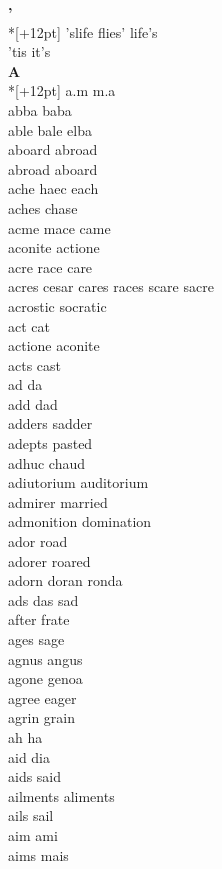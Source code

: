 
\vspace{14pt}
\noindent\textbf{\Large '}\\*[+12pt]
'slife flies' life's\\
'tis it's\\

\vspace{14pt}
\noindent\textbf{\Large A}\\*[+12pt]
a.m m.a\\
abba baba\\
able bale elba\\
aboard abroad\\
abroad aboard\\
ache haec each\\
aches chase\\
acme mace came\\
aconite actione\\
acre race care\\
acres cesar cares races scare sacre\\
acrostic socratic\\
act cat\\
actione aconite\\
acts cast\\
ad da\\
add dad\\
adders sadder\\
adepts pasted\\
adhuc chaud\\
adiutorium auditorium\\
admirer married\\
admonition domination\\
ador road\\
adorer roared\\
adorn doran ronda\\
ads das sad\\
after frate\\
ages sage\\
agnus angus\\
agone genoa\\
agree eager\\
agrin grain\\
ah ha\\
aid dia\\
aids said\\
ailments aliments\\
ails sail\\
aim ami\\
aims mais\\
